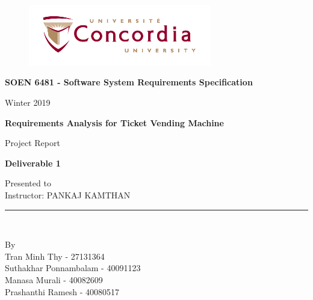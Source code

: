 \documentclass[11pt, english]{article}
\begin{document}
\begin{titlepage}

\begin{center}
\vspace*{-1in}
\begin{figure}[htb]
\begin{center}
\includegraphics[width=8cm]{logo}
\end{center}
\end{figure}
\begin{Large}
\textbf{SOEN 6481 - Software System Requirements Specification} \\
\end{Large}
\vspace*{0.1in}
Winter 2019\\
\vspace*{0.5in}
\begin{Large}
\textbf{Requirements Analysis for Ticket Vending Machine} \\
\end{Large}
\vspace*{0.4in}
\begin{large}
Project Report\\
\end{large}
\vspace*{0.2in}
\begin{Large}
\textbf{Deliverable 1} \\
\end{Large}
\vspace*{0.3in}
\begin{large}
Presented to \\
\vspace*{0.1in}
Instructor: PANKAJ KAMTHAN 
 \\
\end{large}
\vspace*{0.3in}
\rule{80mm}{0.1mm}\\
\vspace*{0.1in}
\begin{large}
By \\
Tran Minh Thy - 27131364\\
Suthakhar Ponnambalam - 40091123\\
Manasa Murali - 40082609\\
Prashanthi Ramesh - 40080517\\

\end{large}
\end{center}
\end{titlepage}
\end{document}
